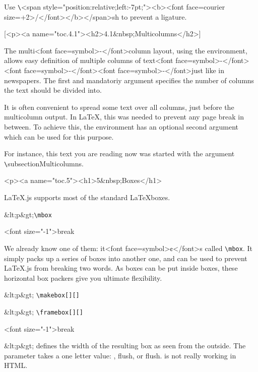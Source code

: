 Use \texttt\textbackslash<span style="position:relative;left:-7pt;"><b><font face=courier size=+2>/</font></b></span>sh to prevent a ligature.



[<p><a name="toc.4.1"><h2>4.1&nbsp;Multicolumns</h2>]

The multi<font face=symbol>-</font>column layout, using the \textttmulticols environment, allows easy
definition of multiple columns of text<font face=symbol>-</font><font face=symbol>-</font><font face=symbol>-</font>just like in newspapers. The first
and mandatoriy argument specifies the number of columns the text should be divided into.

It is often convenient to spread some text over all columns, just before the multicolumn
output. In \LaTeX, this was needed to prevent any page break in between. To achieve this,
the \textttmulticols environment has an optional second argument which can be used for
this purpose.

For instance, this text you are reading now was started with the argument
\texttt\textbackslash subsection{Multicolumns}.

\endmulticols



<p><a name="toc.5"><h1>5&nbsp;Boxes</h1>

\LaTeX.js supports most of the standard \LaTeX boxes.

\medbreak

&lt;p&gt;\fbox\verb|\mbox|\emphtext\verb||

<font size="-1">break

We already know one of them: it<font face=symbol>¢</font>s called \verb|\mbox|. It simply packs up a series of boxes into another one, and
can be used to prevent \LaTeX.js from breaking two words. As boxes can be put inside boxes, these horizontal box
packers give you ultimate flexibility.

\bigbreak

&lt;p&gt;\fbox
\verb|\makebox[|\emphwidth\verb|][|\emphpos\verb|]|\emphtext\verb||


&lt;p&gt;\fbox
\verb|\framebox[|\emphwidth\verb|][|\emphpos\verb|]|\emphtext\verb||


<font size="-1">break

&lt;p&gt;
\emphwidth defines the width of the resulting box as seen from the outside.
The \emphpos parameter takes a one letter value: \textbfcenter,
flush\textbfleft, or flush\textbfright. \textbfspread is not really working
in HTML.


